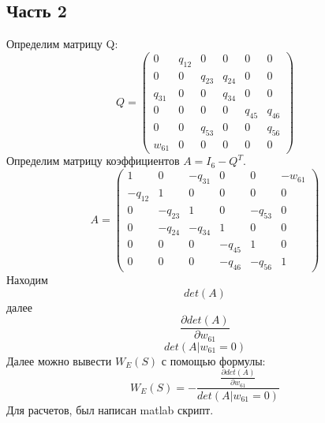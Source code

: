 \documentclass[14pt,a4paper,report]{report}
\begin{document}
\subsection{Часть 2}

Определим матрицу Q:
\begin{equation*}
Q = 
 \begin{pmatrix}
  0 & q_{12} & 0 & 0 & 0 & 0 \\
  0 & 0 & q_{23} & q_{24} & 0 & 0 \\ 
  q_{31} & 0 & 0 & q_{34} & 0 & 0 \\ 
  0 & 0 & 0 & 0 & q_{45} & q_{46} \\ 
  0 & 0 & q_{53} & 0 & 0 & q_{56} \\ 
  w_{61} & 0 & 0 & 0 & 0 & 0 
 \end{pmatrix}
\end{equation*}
Определим матрицу коэффициентов $A=I_6-Q^T$.
\begin{equation*}
A = 
 \begin{pmatrix}
    1&       0&    -q_{31}&    0&    0& -w_{61}\\
 -q_{12}& 1 & 0&    0&       0&    0\\
    0&    -q_{23}&    1&    0&       -q_{53}&    0\\
    0&       -q_{24}& -q_{34}&    1&       0&    0\\
    0&       0&    0& -q_{45}& 1 &    0\\
    0&       0&    0&    -q_{46}&    -q_{56}&    1
 \end{pmatrix}
\end{equation*}
Находим 
\begin{equation*}
det(A)
\end{equation*}
далее
\begin{equation*}
\frac{\partial det(A)}{\partial w_{61}}
\end{equation*}
\begin{equation*}
det(A | w_{61}=0)
\end{equation*}
Далее можно вывести $W_E(S)$ с помощью формулы:
\begin{equation*}
W_E(S)=-\frac{\frac{\partial det(A)}{\partial w_{61}}}{det(A | w_{61}=0)}
\end{equation*}
Для расчетов, был написан matlab скрипт.
\end{document}
